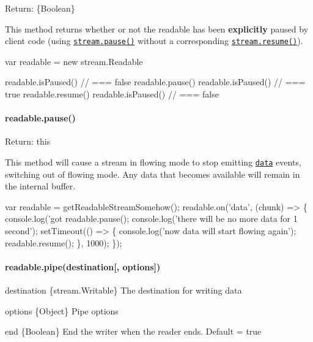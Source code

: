\begin{DoxyItemize}
\item Return\+: \{Boolean\}
\end{DoxyItemize}

This method returns whether or not the {\ttfamily readable} has been {\bfseries explicitly} paused by client code (using \href{#stream_readable_pause}{\tt {\ttfamily stream.\+pause()}} without a corresponding \href{#stream_readable_resume}{\tt {\ttfamily stream.\+resume()}}).


\begin{DoxyCode}
var readable = new stream.Readable

readable.isPaused() // === false
readable.pause()
readable.isPaused() // === true
readable.resume()
readable.isPaused() // === false
\end{DoxyCode}


\paragraph*{readable.\+pause()}


\begin{DoxyItemize}
\item Return\+: {\ttfamily this}
\end{DoxyItemize}

This method will cause a stream in flowing mode to stop emitting \href{#stream_event_data}{\tt {\ttfamily \textquotesingle{}data\textquotesingle{}}} events, switching out of flowing mode. Any data that becomes available will remain in the internal buffer.


\begin{DoxyCode}
var readable = getReadableStreamSomehow();
readable.on('data', (chunk) => \{
  console.log('got %
  readable.pause();
  console.log('there will be no more data for 1 second');
  setTimeout(() => \{
    console.log('now data will start flowing again');
    readable.resume();
  \}, 1000);
\});
\end{DoxyCode}


\paragraph*{readable.\+pipe(destination\mbox{[}, options\mbox{]})}


\begin{DoxyItemize}
\item {\ttfamily destination} \{stream.\+Writable\} The destination for writing data
\item {\ttfamily options} \{Object\} Pipe options
\begin{DoxyItemize}
\item {\ttfamily end} \{Boolean\} End the writer when the reader ends. Default = {\ttfamily true}
\end{DoxyItemize}
\end{DoxyItemize}

